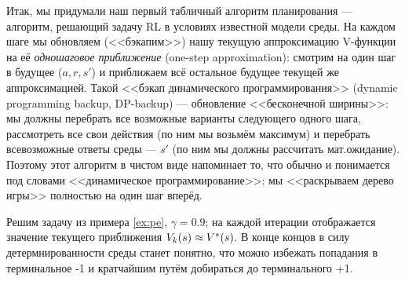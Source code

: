 Итак, мы придумали наш первый табличный алгоритм планирования --- алгоритм, решающий задачу RL в условиях известной модели среды. На каждом шаге мы обновляем (<<бэкапим>>) нашу текущую аппроксимацию V-функции на её \emph{одношаговое приближение} (one-step approximation): смотрим на один шаг в будущее ($a, r, s'$) и приближаем всё остальное будущее текущей же аппроксимацией. Такой <<бэкап динамического программирования>> (dynamic programming backup, DP-backup) --- обновление <<бесконечной ширины>>: мы должны перебрать все возможные варианты следующего одного шага, рассмотреть все свои действия (по ним мы возьмём максимум) и перебрать всевозможные ответы среды --- $s'$ (по ним мы должны рассчитать мат.ожидание). Поэтому этот алгоритм в чистом виде напоминает то, что обычно и понимается под словами <<динамическое программирование>>: мы <<раскрываем дерево игры>> полностью на один шаг вперёд.

\begin{exampleBox}[righthand ratio=0.25, sidebyside, sidebyside align=center, lower separated=false]{}
Решим задачу из примера \ref{ex:pe}, $\gamma = 0.9$; на каждой итерации отображается значение текущего приближения $V_k(s) \HM\approx V^{*}(s)$. В конце концов в силу детермнированности среды станет понятно, что можно избежать попадания в терминальное -1 и кратчайшим путём добираться до терминального +1.

\tcblower
\end{exampleBox}



